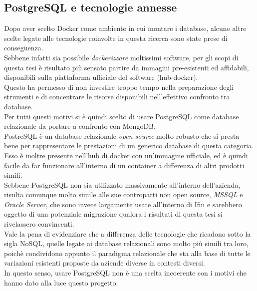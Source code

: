 \subsection{PostgreSQL e tecnologie annesse}
Dopo aver scelto Docker come ambiente in cui montare i database, alcune altre scelte legate alle tecnologie coinvolte in questa ricerca sono state prese di conseguenza.\\
Sebbene infatti sia possibile \textit{dockerizzare} moltissimi software, per gli scopi di questa tesi è risultato più sensato partire da immagini pre-esistenti ed affidabili, disponibili sulla piattaforma ufficiale del software (hub-docker).\\
Questo ha permesso di non investire troppo tempo nella preparazione degli strumenti e di concentrare le risorse disponibili nell'effettivo confronto tra database.\\

\noindent Per tutti questi motivi si è quindi scelto di usare PostgreSQL come database relazionale da portare a confronto con MongoDB.\\
PostreSQL è un database relazionale \textit{open source} molto robusto che si presta bene per rappresentare le prestazioni di un generico database di questa categoria. Esso è inoltre presente nell'hub di docker con un'immagine ufficiale, ed è quindi facile da far funzionare all'interno di un container a differenza di altri prodotti simili.\\
Sebbene PostgreSQL non sia utilizzato massivamente all'interno dell'azienda, risulta comunque molto simile alle sue controparti non open source, \textit{MSSQL} e \textit{Oracle Server}, che sono invece largamente usate all'interno di Ifin e sarebbero oggetto di una potenziale migrazione qualora i risultati di questa tesi si rivelassero convincenti.\\

\noindent Vale la pena di evidenziare che a differenza delle tecnologie che ricadono sotto la sigla NoSQL, quelle legate ai database relazionali sono molto più simili tra loro, poichè condividono appunto il paradigma relazionale che sta alla base di tutte le variazioni esistenti proposte da aziende diverse in contesti diversi.\\
In questo senso, usare PostgreSQL non è una scelta incoerente con i motivi che hanno dato alla luce questo progetto.\\

